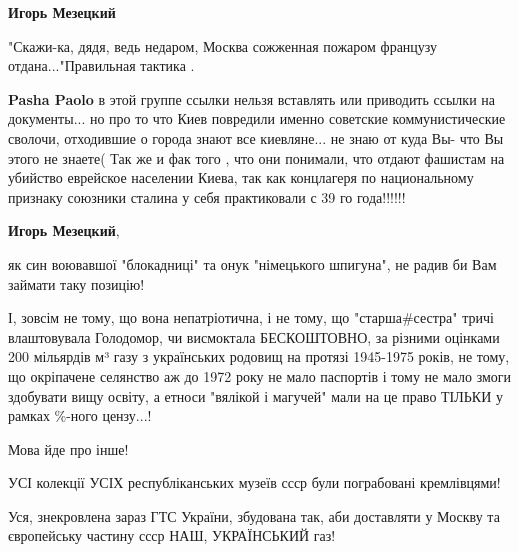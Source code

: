 \begin{itemize}
\begin{itemize}
\begin{itemize}
 
\textbf{Игорь Мезецкий} 

"Скажи-ка, дядя, ведь недаром, Москва сожженная пожаром французу
отдана..."Правильная тактика .

 
\textbf{Pasha Paolo} в этой группе ссылки нельзя вставлять или приводить ссылки
на документы... но про то что Киев повредили именно советские коммунистические
сволочи, отходившие о города знают все киевляне... не знаю от куда Вы- что Вы
этого не знаете( Так же и фак того , что они понимали, что отдают фашистам на
убийство еврейское населении Киева, так как концлагеря по национальному
признаку союзники сталина у себя практиковали с 39 го года!!!!!!

 
\textbf{Игорь Мезецкий}, 

як син воювавшої "блокадниці" та онук "німецького шпигуна", не радив би Вам
займати таку позицію!

І, зовсім не тому, що вона непатріотична, і не тому, що "старша\#сестра" тричі
влаштовувала Голодомор, чи висмоктала БЕСКОШТОВНО, за різними оцінками ~ 200
мільярдів м³ газу з українських родовищ на протязі 1945-1975 років, не тому, що
окріпачене селянство аж до 1972 року не мало паспортів і тому не мало змоги
здобувати вищу освіту, а етноси "вялікой і магучей" мали на це право ТІЛЬКИ у
рамках \%-ного цензу...!

Мова йде про інше!

УСІ колекції УСІХ республіканських музеїв ссср були пограбовані кремлівцями!

Уся, знекровлена зараз ГТС України, збудована так, аби доставляти у Москву та
європейську частину ссср НАШ, УКРАЇНСЬКИЙ газ!


\end{itemize}
\end{itemize}
\end{itemize}
